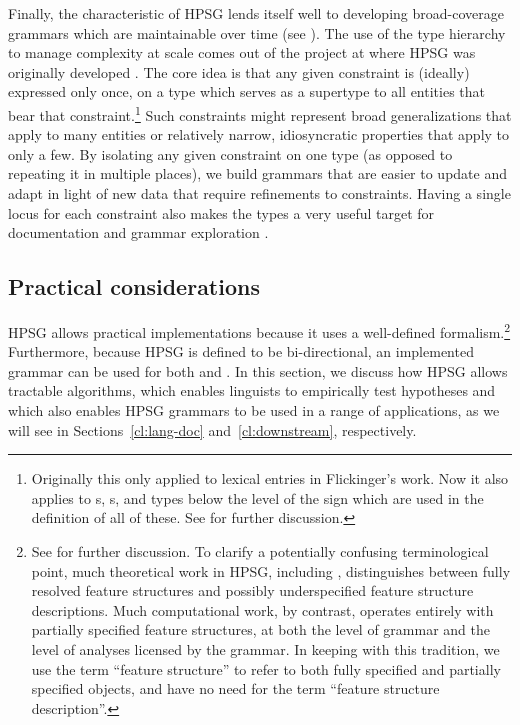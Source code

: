 \documentclass[output=paper,biblatex,babelshorthands,newtxmath,draftmode,colorlinks,citecolor=brown]{langscibook}
\begin{document}
\largerpage
Finally, the  characteristic of HPSG lends itself well
to developing broad-coverage grammars which are
maintainable over time (see \citealt{Syg:Win:11}).
The use of the type hierarchy to manage complexity at scale
comes out of the project at  where HPSG was originally developed
\citep{FPW85a,Flickinger87}.
The core idea is that any given constraint is (ideally) expressed only once,
on a type which serves as a supertype to all entities that bear that constraint.\footnote{%
    Originally this only applied to lexical entries in Flickinger's work.
    Now it also applies to s, s,
    and types below the level of the sign which are used in the definition of all of these.
    See 
    for further discussion.
}
Such constraints might represent broad generalizations that apply to many entities
or relatively narrow, idiosyncratic properties that apply to only a few.
By isolating any given constraint on one type (as opposed to repeating it in multiple places),
we build grammars that are easier to update and adapt in light of
new data that require refinements to constraints.
Having a single locus for each constraint also makes the types a very useful target
for documentation \citep{Hashimoto-etal:07}
and grammar exploration \citep{Letcher:18}. 


\subsection{Practical considerations}
\label{cl:prac}

\largerpage
HPSG allows practical implementations because it uses a well-defined formalism.\footnote{\label{cl:fn-feature-structure}%
    See  for further discussion.
    To clarify a potentially confusing terminological point,
    much theoretical work in HPSG, including \citet{ps2},
    distinguishes between fully resolved feature structures
    and possibly underspecified feature structure descriptions.
    Much computational work, by contrast, operates entirely with partially specified feature structures,
    at both the level of grammar and the level of analyses licensed by the grammar.
    In keeping with this tradition, we use the term
    ``feature structure'' to refer to both fully specified and partially specified objects,
    and have no need for the term ``feature structure description''.
}
Furthermore, because HPSG is defined to be bi-directional,
an implemented grammar can be used for both  and .
In this section, we discuss how HPSG allows tractable algorithms,
which enables linguists to empirically test hypotheses
and which also enables HPSG grammars to be used in a range of applications,
as we will see in Sections~\ref{cl:lang-doc} and~\ref{cl:downstream}, respectively.
\end{document}

